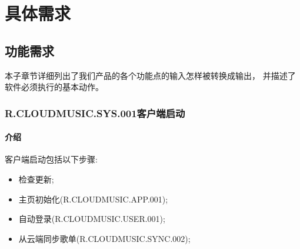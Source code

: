 
\chapter{具体需求}

\section{功能需求}

本子章节详细列出了我们产品的各个功能点的输入怎样被转换成输出，
	并描述了软件必须执行的基本动作。

\subsection{R.CLOUDMUSIC.SYS.001客户端启动}
\subsubsection{介绍}
客户端启动包括以下步骤:
	\begin{itemize}
		\item 检查更新;
		\item 主页初始化(R.CLOUDMUSIC.APP.001);
		\item 自动登录(R.CLOUDMUSIC.USER.001);
		\item 从云端同步歌单(R.CLOUDMUSIC.SYNC.002);
	\end{itemize}
